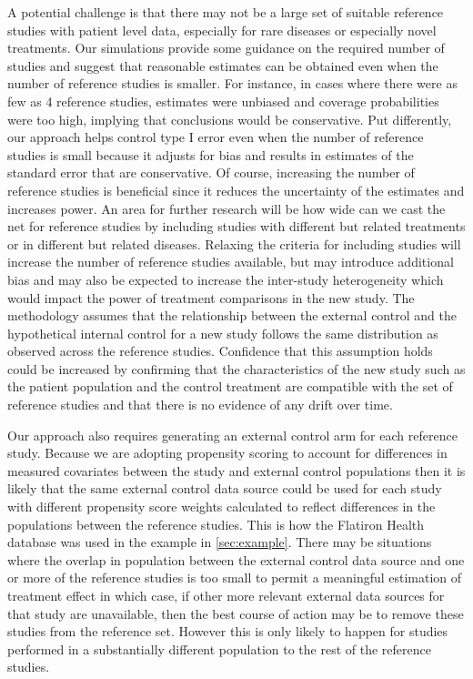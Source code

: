 \documentclass[11pt,final,fleqn]{article}\usepackage[]{graphicx}\usepackage[]{color}
\begin{document}
A potential challenge is that there may not be a large set of suitable reference studies with patient level data, especially for rare diseases or especially novel treatments. Our simulations provide some guidance on the required number of studies and suggest that reasonable estimates can be obtained even when the number of reference studies is smaller. For instance, in cases where there were as few as 4 reference studies, estimates were unbiased and coverage probabilities were too high, implying that conclusions would be conservative. Put differently, our approach helps control type I error even when the number of reference studies is small because it adjusts for bias and results in estimates of the standard error that are conservative. Of course, increasing the number of reference studies is beneficial since it reduces the uncertainty of the estimates and increases power. An area for further research will be how wide can we cast the net for reference studies by including studies with different but related treatments or in different but related diseases. Relaxing the criteria for including studies will increase the number of reference studies available, but may introduce additional bias and may also be expected to increase the inter-study heterogeneity which would impact the power of treatment comparisons in the new study. The methodology assumes that the relationship between the external control and the hypothetical internal control for a new study follows the same distribution as observed across the reference studies. Confidence that this assumption holds could be increased by confirming that the characteristics of the new study such as the patient population and the control treatment are compatible with the set of reference studies and that there is no evidence of any drift over time.  

Our approach also requires generating an external control arm for each reference study. Because we are adopting propensity scoring to account for differences in measured covariates between the study and external control populations then it is likely that the same external control data source could be used for each study with different propensity score weights calculated to reflect differences in the populations between the reference studies. This is how the Flatiron Health database was used in the example in \autoref{sec:example}. There may be situations where the overlap in population between the external control data source and one or more of the reference studies is too small to permit a meaningful estimation of treatment effect in which case, if other more relevant external data sources for that study are unavailable, then the best course of action may be to remove these studies from the reference set. However this is only likely to happen for studies performed in a substantially different population to the rest of the reference studies.  
\end{document}
